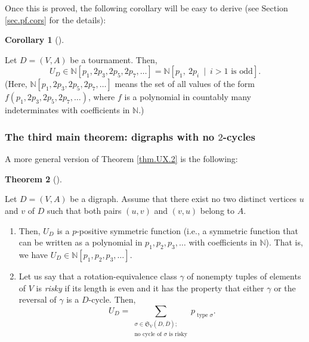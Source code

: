 \documentclass[numbers=enddot,12pt,final,onecolumn,notitlepage]{scrartcl}%
\numberwithin{exer}{section}
\theoremstyle{definition}
\newtheorem{theo}{Theorem}[section]
\newenvironment{theorem}[1][]
{\begin{theo}[#1]\begin{leftbar}}
{\end{leftbar}\end{theo}}
\newtheorem{coro}[theo]{Corollary}
\newenvironment{corollary}[1][]
{\begin{coro}[#1]\begin{leftbar}}
{\end{leftbar}\end{coro}}
\let\sumnonlimits\sum
\renewcommand{\sum}{\sumnonlimits\limits}
\begin{document}
Once this is proved, the following corollary will be easy to derive (see
Section \ref{sec.pf.cors} for the details):

\begin{corollary}
\label{cor.UX.tournament-N}Let $D=\left(  V,A\right)  $ be a tournament.
Then,
\[
U_{D}\in\mathbb{N}\left[  p_{1},2p_{3},2p_{5},2p_{7},\ldots\right]
=\mathbb{N}\left[  p_{1},\ 2p_{i}\ \mid\ i>1\text{ is odd}\right]  .
\]
(Here, $\mathbb{N}\left[  p_{1},2p_{3},2p_{5},2p_{7},\ldots\right]  $ means
the set of all values of the form $f\left(  p_{1},2p_{3},2p_{5},2p_{7}%
,\ldots\right)  $, where $f$ is a polynomial in countably many indeterminates
with coefficients in $\mathbb{N}$.)
\end{corollary}

\subsubsection{The third main theorem: digraphs with no $2$-cycles}

A more general version of Theorem \ref{thm.UX.2} is the following:

\begin{theorem}
\label{thm.UX.3}Let $D=\left(  V,A\right)  $ be a digraph. Assume that there
exist no two distinct vertices $u$ and $v$ of $D$ such that both pairs
$\left(  u,v\right)  $ and $\left(  v,u\right)  $ belong to $A$.

\begin{enumerate}
\item[\textbf{(a)}] Then, $U_{D}$ is a $p$-positive symmetric function (i.e.,
a symmetric function that can be written as a polynomial in $p_{1},p_{2}%
,p_{3},\ldots$ with coefficients in $\mathbb{N}$). That is, we have $U_{D}%
\in\mathbb{N}\left[  p_{1},p_{2},p_{3},\ldots\right]  $.

\item[\textbf{(b)}] Let us say that a rotation-equivalence class $\gamma$ of
nonempty tuples of elements of $V$ is \emph{risky} if its length is even and
it has the property that either $\gamma$ or the reversal of $\gamma$ is a
$D$-cycle. Then,%
\[
U_{D}=\sum_{\substack{\sigma\in\mathfrak{S}_{V}\left(  D,\overline{D}\right)
;\\\text{no cycle of }\sigma\text{ is risky}}}p_{\operatorname*{type}\sigma}.
\]

\end{enumerate}
\end{theorem}
\end{document}
